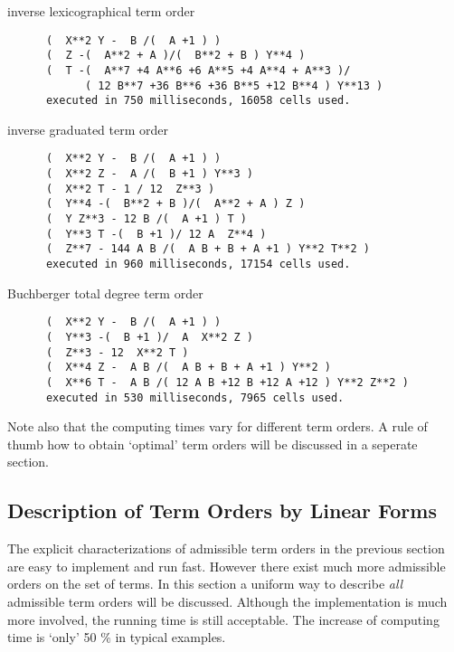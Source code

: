 \begin{description}
\item inverse lexicographical term order  
{\footnotesize
\begin{verbatim}
      (  X**2 Y -  B /(  A +1 ) )
      (  Z -(  A**2 + A )/(  B**2 + B ) Y**4 )
      (  T -(  A**7 +4 A**6 +6 A**5 +4 A**4 + A**3 )/
            ( 12 B**7 +36 B**6 +36 B**5 +12 B**4 ) Y**13 )
      executed in 750 milliseconds, 16058 cells used.
\end{verbatim}
}
\item inverse graduated term order 
{\footnotesize
\begin{verbatim}
      (  X**2 Y -  B /(  A +1 ) )
      (  X**2 Z -  A /(  B +1 ) Y**3 )
      (  X**2 T - 1 / 12  Z**3 )
      (  Y**4 -(  B**2 + B )/(  A**2 + A ) Z )
      (  Y Z**3 - 12 B /(  A +1 ) T )
      (  Y**3 T -(  B +1 )/ 12 A  Z**4 )
      (  Z**7 - 144 A B /(  A B + B + A +1 ) Y**2 T**2 )
      executed in 960 milliseconds, 17154 cells used.
\end{verbatim}
}
\item Buchberger total degree term order 
{\footnotesize
\begin{verbatim}
      (  X**2 Y -  B /(  A +1 ) )
      (  Y**3 -(  B +1 )/  A  X**2 Z )
      (  Z**3 - 12  X**2 T )
      (  X**4 Z -  A B /(  A B + B + A +1 ) Y**2 )
      (  X**6 T -  A B /( 12 A B +12 B +12 A +12 ) Y**2 Z**2 )
      executed in 530 milliseconds, 7965 cells used.
\end{verbatim}
}
\end{description}

Note also that the computing times vary for different 
term orders. 
A rule of thumb how to obtain `optimal' term orders will 
be discussed in a seperate section.


\subsection{Description of Term Orders by Linear Forms} %

The explicit characterizations of admissible 
term orders in the previous section are easy to 
implement and run fast. 
However there exist much more admissible 
orders on the set of terms.  
In this section a uniform way to describe 
{\em all} admissible term orders will be discussed.
Although the implementation is much more involved, 
the running time is still acceptable.
The increase of computing time is 
`only' 50 $\%$ in typical examples. 

